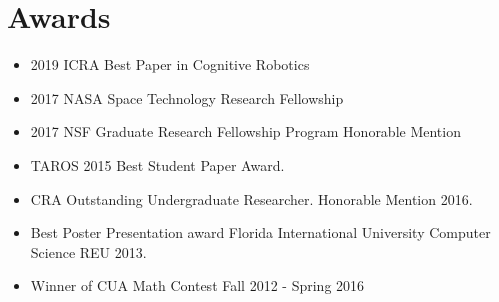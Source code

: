 \section{Awards}

\vspace{6pt}

\begin{itemize}

\item[]{2019 ICRA Best Paper in Cognitive Robotics}

\vspace{6pt}

\item[]{2017 NASA Space Technology Research Fellowship}

\vspace{6pt}

\item[]{2017 NSF Graduate Research Fellowship Program Honorable Mention}

\vspace{6pt}

\item[]{TAROS 2015 Best Student Paper Award.}

\vspace{6pt}

\item[]{CRA Outstanding Undergraduate Researcher.  Honorable Mention 2016.}

\vspace{6pt}

\item[]{Best Poster Presentation award Florida International University Computer Science REU 2013.}

\vspace{6pt}

\item[]{Winner of CUA Math Contest Fall 2012 - Spring 2016}

\end{itemize}